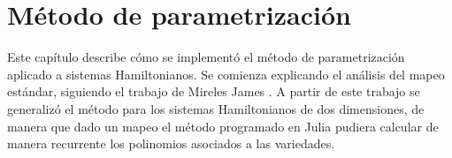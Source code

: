 
\chapter{Método de parametrización}
Este capítulo describe cómo se implementó el método de parametrización aplicado a sistemas Hamiltonianos. Se comienza explicando el análisis del mapeo es\-tán\-dar, siguiendo el trabajo de Mireles James \cite{Mireles}. A partir de este trabajo se generalizó el método para los sistemas Hamiltonianos de dos dimensiones, de manera que dado un mapeo el método programado en Julia pudiera calcular de manera recurrente los polinomios asociados a las variedades.
